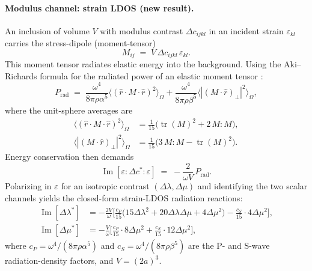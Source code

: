 \documentclass[11pt,a4paper]{article}
\newcommand{\D}{\Delta}
\theoremstyle{plain}
\theoremstyle{definition}
\theoremstyle{remark}
\begin{document}
\paragraph{Modulus channel: strain LDOS (new result).}
An inclusion of volume $V$ with modulus contrast $\D c_{ijkl}$ in an
incident strain $\varepsilon_{kl}$ carries the stress-dipole (moment-tensor)
\begin{equation}
  M_{ij} \;=\; V\,\D c_{ijkl}\,\varepsilon_{kl}.
  \label{eq:moment-tensor}
\end{equation}
This moment tensor radiates elastic energy into the background.  Using the
Aki--Richards formula for the radiated power of an elastic moment tensor
\cite{akirichards2002}:
\begin{equation}
  P_{\mathrm{rad}}
  \;=\; \frac{\omega^4}{8\pi\rho\alpha^5}
        \bigl\langle({\hat{r}}\cdot M\cdot{\hat{r}})^2\bigr\rangle_{\Omega}
    + \frac{\omega^4}{8\pi\rho\beta^5}
        \bigl\langle|(M\cdot{\hat{r}})_{\perp}|^2\bigr\rangle_{\Omega},
  \label{eq:Prad-moment}
\end{equation}
where the unit-sphere averages are
\begin{align}
  \bigl\langle(\hat{r}\cdot M\cdot\hat{r})^2\bigr\rangle_\Omega
    &= \tfrac{1}{15}\bigl(\operatorname{tr}(M)^2 + 2\,M\!:\!M\bigr),
  \label{eq:sphere-avg-P}\\
  \bigl\langle|(M\cdot\hat{r})_\perp|^2\bigr\rangle_\Omega
    &= \tfrac{1}{15}\bigl(3\,M\!:\!M - \operatorname{tr}(M)^2\bigr).
  \label{eq:sphere-avg-S}
\end{align}
Energy conservation then demands
\begin{equation}
  \operatorname{Im}[\varepsilon\!:\!\D c^{*}\!:\!\varepsilon]
  \;=\; -\frac{2}{\omega V}\,P_{\mathrm{rad}}.
  \label{eq:energy-conservation}
\end{equation}
Polarizing in $\varepsilon$ for an isotropic contrast $(\D\lambda, \D\mu)$
and identifying the two scalar channels yields the closed-form
strain-LDOS radiation reactions:
\begin{align}
  \operatorname{Im}[\D\lambda^*]
    &= -\frac{2V}{\omega}\biggl[
        \frac{c_P}{15}\bigl(15\D\lambda^2 + 20\D\lambda\D\mu + 4\D\mu^2\bigr)
        - \frac{c_S}{15}\cdot 4\D\mu^2
      \biggr],
  \label{eq:ImDlambda}\\
  \operatorname{Im}[\D\mu^*]
    &= -\frac{V}{\omega}\biggl[
        \frac{c_P}{15}\cdot 8\D\mu^2
        + \frac{c_S}{15}\cdot 12\D\mu^2
      \biggr],
  \label{eq:ImDmu}
\end{align}
where $c_P = \omega^4/(8\pi\rho\alpha^5)$ and $c_S = \omega^4/(8\pi\rho\beta^5)$
are the P- and S-wave radiation-density factors, and $V = (2a)^3$.
\end{document}
